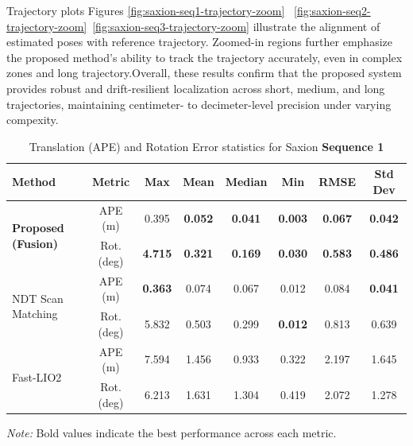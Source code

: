 Trajectory plots Figures \ref{fig:saxion-seq1-trajectory-zoom}~ \ref{fig:saxion-seq2-trajectory-zoom}~\ref{fig:saxion-seq3-trajectory-zoom}  illustrate the alignment of estimated poses with reference trajectory. Zoomed-in regions further emphasize the proposed method’s ability to track the trajectory accurately, even in complex zones and long trajectory.Overall, these results confirm that the proposed system provides robust and drift-resilient localization across short, medium, and long trajectories, maintaining centimeter- to decimeter-level precision under varying compexity.



\begin{table}[H]
	\centering
	\renewcommand{\arraystretch}{0.6}
	\setlength{\tabcolsep}{15pt}
	\caption{Translation (APE) and Rotation Error statistics for Saxion \textbf{Sequence 1} }
	\captionsetup{justification=justified, singlelinecheck=false}
	
	
	\label{tab:ape_rot_saxion_seq1}
	
	\begin{adjustbox}{width=\textwidth}
		\begin{tabular}{@{}lccccccc@{}}
			\toprule
			\textbf{Method} & \textbf{Metric} & \textbf{Max} & \textbf{Mean} & \textbf{Median} & \textbf{Min} & \textbf{RMSE} & \textbf{Std Dev} \\
			\midrule
			
			\multirow{2}{*}{\textbf{Proposed (Fusion)}} 
			& APE (m)        & 0.395   & \textbf{0.052 }   & \textbf{0.041}     & \textbf{0.003 }   &\textbf{ 0.067}   & \textbf{0.042 }\\
			& Rot. (deg)     & \textbf{4.715}   & \textbf{0.321}    & \textbf{0.169}     &\textbf{ 0.030 }   & \textbf{0.583}   &\textbf{ 0.486} \\
			\midrule
			
			\multirow{2}{*}{NDT Scan Matching} 
			& APE (m)        & \textbf{0.363 }  & 0.074    & 0.067     & 0.012    & 0.084   & \textbf{0.041} \\
			& Rot. (deg)     & 5.832   & 0.503    & 0.299     &\textbf{ 0.012}    & 0.813   & 0.639 \\
			\midrule
			
			\multirow{2}{*}{Fast-LIO2} 
			& APE (m)        & 7.594   & 1.456    & 0.933     & 0.322    & 2.197   & 1.645 \\
			& Rot. (deg)     & 6.213   & 1.631    & 1.304     & 0.419    & 2.072   & 1.278 \\
			\bottomrule
		\end{tabular}
	\end{adjustbox}
\vspace{0.5em}
{\footnotesize \textit{Note:} Bold values indicate the best performance across each metric.}
\end{table}

